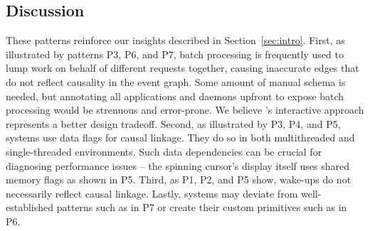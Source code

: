 \subsection{Discussion}

These patterns reinforce our insights described in Section~\ref{sec:intro}.
First, as illustrated by patterns P3, P6, and P7, batch processing is
frequently used to lump work on behalf of different requests together, causing
inaccurate edges that do not reflect causality in the event graph.  Some amount
of manual schema is needed, but annotating all applications and daemons upfront
to expose batch processing would be strenuous and error-prone.  We believe
\xxx's interactive approach represents a better design tradeoff.  Second, as
illustrated by P3, P4, and P5, systems use data flags for causal linkage.  They
do so in both multithreaded and single-threaded environments.  Such data
dependencies can be crucial for diagnosing performance issues -- the spinning
cursor's display itself uses shared memory flags as shown in P5.  Third, as P1,
P2, and P5 show, wake-ups do not necessarily reflect causal linkage.  Lastly,
systems may deviate from well-established patterns such as in P7 or create
their custom primitives such as in P6.
